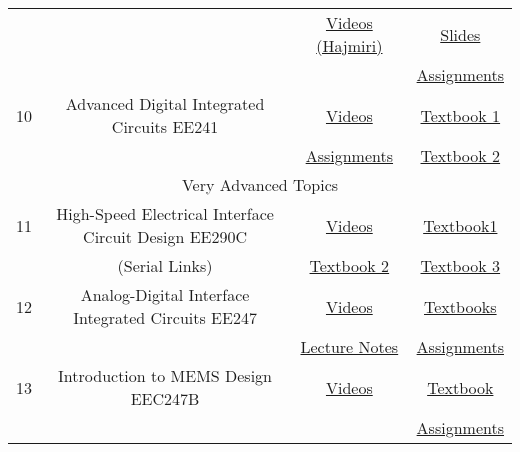 \documentclass{article}
\begin{document}
\begin{table}[H]
{\begin{tabular}{|c|c|c|c|}
            & & \href{https://youtube.com/playlist?list=PLc7Gz02Znph-c2-ssFpRrzYwbzplXfXUT}{Videos (Hajmiri)}& \href{https://inst.eecs.berkeley.edu/~ee240b/sp18/lectures.html}{Slides}\\ 
            & & & \href{http://bwrcs.eecs.berkeley.edu/Classes/icdesign/ee240_s09/homework.html}{Assignments}\\ \hline
            10& Advanced Digital Integrated Circuits EE241& \href{https://archive.org/details/ucberkeley_webcast_itunesu_354820903/01.+2009-01-21+-+Lecture+1.mp4}{Videos}& \href{https://drive.google.com/file/d/1-clLoEkncZoUtc61PNqQZfctg7kJ0UlC/view}{Textbook 1}\\ 
            & & \href{https://inst.eecs.berkeley.edu//~ee241/sp20/}{Assignments}& \href{https://link.springer.com/book/10.1007/978-0-387-71713-5}{Textbook 2}\\ \hline
            \multicolumn{4}{|c|}{Very Advanced Topics}\\ \hline
            11& High-Speed Electrical Interface Circuit Design EE290C& \href{http://www.infocobuild.com/education/audio-video-courses/electronics/ee290c-spring2011-berkeley.html}{Videos}& \href{http://library.lol/main/E6402773287FE47D66C6C11F1736198B}{Textbook1}\\ 
            & (Serial Links)& \href{http://library.lol/main/0BF5887F3066FC626CE22B38E8AC0D9E}{Textbook 2}& \href{http://library.lol/main/85AA00730E0781CA50E63BF78E2E86D5}{Textbook 3}\\ \hline
            12& Analog-Digital Interface Integrated Circuits EE247& \href{https://archive.org/details/ucberkeley_webcast_itunesu_354821202}{Videos}& \href{https://inst.eecs.berkeley.edu/~ee247/fa10/references.html}{Textbooks}\\ 
            & & \href{https://inst.eecs.berkeley.edu/~ee247/fa10/lectures.html}{Lecture Notes}& \href{https://inst.eecs.berkeley.edu/~ee247/fa10/homework.html}{Assignments}\\ \hline
            13& Introduction to MEMS Design EEC247B& \href{https://inst.eecs.berkeley.edu/~ee247b/sp19/lectures.html}{Videos}& \href{https://link.springer.com/book/10.1007/b117574}{Textbook}\\
            & & & \href{https://inst.eecs.berkeley.edu/~ee247b/sp19/homework.html}{Assignments}\\ \hline
        \end{tabular}
        }
\end{table}
\end{document}
